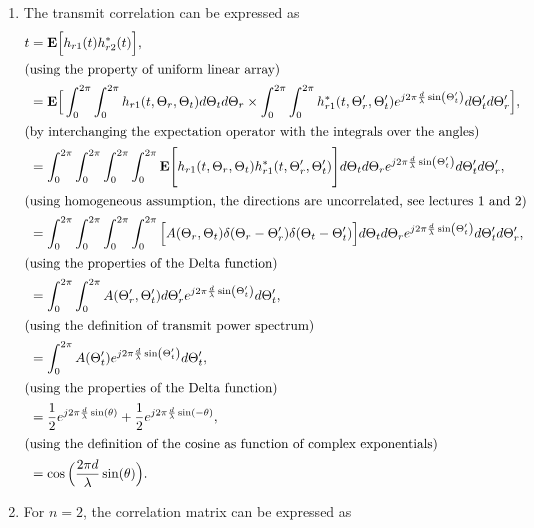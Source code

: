 \documentclass [a4paper, 11pt] {article}
\begin{document}
\begin{solution}
\begin{enumerate}
    \item The transmit correlation can be expressed as 
    \begin{align}
        t &= \mathbf{E}\Big[h_{r1}(t)h_{r2}^*(t) \Big], \\
        \intertext{(using the property of uniform linear array)}
        &= \mathbf{E}\Big[\int_{0}^{2\pi} \int_{0}^{2\pi}h_{r1}(t,\Theta_r,\Theta_t) d\Theta_t d\Theta_r \times \int_{0}^{2\pi} \int_{0}^{2\pi}h_{r1}^*(t,\Theta_r',\Theta_t')e^{j2\pi\frac{d}{\lambda}\sin(\Theta_t')} d\Theta_t' d\Theta_r'\Big], \\
        \intertext{(by interchanging the expectation operator with the integrals over the angles)}
        &= \int_{0}^{2\pi} \int_{0}^{2\pi}\int_{0}^{2\pi} \int_{0}^{2\pi} \mathbf{E}\Bigg[h_{r1}(t,\Theta_r,\Theta_t)h_{r1}^*(t,\Theta_r',\Theta_t')\Bigg] d\Theta_t d\Theta_r e^{j2\pi\frac{d}{\lambda}\sin(\Theta_t')} d\Theta_t' d\Theta_r', \\
        \intertext{(using homogeneous assumption, the directions are uncorrelated, see lectures 1 and 2)}
        &= \int_{0}^{2\pi} \int_{0}^{2\pi}\int_{0}^{2\pi} \int_{0}^{2\pi}  \Big[A(\Theta_r,\Theta_t)\delta(\Theta_r - \Theta_r') \delta(\Theta_t - \Theta_t')\Big] d\Theta_t d\Theta_r e^{j2\pi\frac{d}{\lambda}\sin(\Theta_t')} d\Theta_t' d\Theta_r', \\
        \intertext{(using the properties of the Delta function)}
        &= \int_{0}^{2\pi} \int_{0}^{2\pi} A(\Theta_r',\Theta_t') d\Theta_r' e^{j2\pi\frac{d}{\lambda}\sin(\Theta_t')}  d\Theta_t', \\
        \intertext{(using the definition of transmit power spectrum)}
        &= \int_{0}^{2\pi} A(\Theta_t') e^{j2\pi\frac{d}{\lambda}\sin(\Theta_t')}  d\Theta_t', \\
        \intertext{(using the properties of the Delta function)}
        &= \frac{1}{2}e^{j2\pi\frac{d}{\lambda}\sin(\theta)} 
        + \frac{1}{2}e^{j2\pi\frac{d}{\lambda}\sin(-\theta)}, \\
        \intertext{(using the definition of the cosine as function of complex exponentials)}
        &= \cos \Big( \frac{2 \pi d}{\lambda} \sin (\theta) \Big).
    \end{align}
    
    \item For $n = 2$, the correlation matrix can be expressed as 
    

\end{enumerate}
\end{solution}
\end{document}
